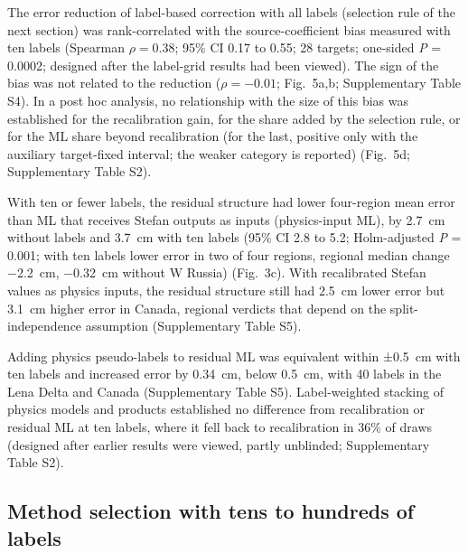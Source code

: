 The error reduction of label-based correction with all labels (selection rule of the next section) was rank-correlated with the source-coefficient bias measured with ten labels (Spearman $\rho = 0.38$; 95\% CI 0.17 to 0.55; 28 targets; one-sided \textit{P} = 0.0002; designed after the label-grid results had been viewed).
The sign of the bias was not related to the reduction ($\rho = -0.01$; Fig.~5a,b; Supplementary Table S4).
In a post hoc analysis, no relationship with the size of this bias was established for the recalibration gain, for the share added by the selection rule, or for the ML share beyond recalibration (for the last, positive only with the auxiliary target-fixed interval; the weaker category is reported) (Fig.~5d; Supplementary Table S2).

With ten or fewer labels, the residual structure had lower four-region mean error than ML that receives Stefan outputs as inputs (physics-input ML), by 2.7~cm without labels and 3.7~cm with ten labels (95\% CI 2.8 to 5.2; Holm-adjusted \textit{P} = 0.001; with ten labels lower error in two of four regions, regional median change −2.2~cm, −0.32~cm without W Russia) (Fig.~3c).
With recalibrated Stefan values as physics inputs, the residual structure still had 2.5~cm lower error but 3.1~cm higher error in Canada, regional verdicts that depend on the split-independence assumption (Supplementary Table S5).

Adding physics pseudo-labels to residual ML was equivalent within ±0.5~cm with ten labels and increased error by 0.34~cm, below 0.5~cm, with 40 labels in the Lena Delta and Canada (Supplementary Table S5).
Label-weighted stacking of physics models and products established no difference from recalibration or residual ML at ten labels, where it fell back to recalibration in 36\% of draws (designed after earlier results were viewed, partly unblinded; Supplementary Table S2).

\subsection{Method selection with tens to hundreds of labels}\label{sec:results-selection}

